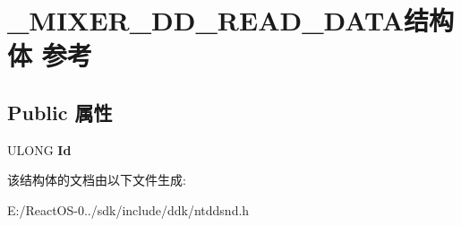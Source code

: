 \hypertarget{struct___m_i_x_e_r___d_d___r_e_a_d___d_a_t_a}{}\section{\+\_\+\+M\+I\+X\+E\+R\+\_\+\+D\+D\+\_\+\+R\+E\+A\+D\+\_\+\+D\+A\+T\+A结构体 参考}
\label{struct___m_i_x_e_r___d_d___r_e_a_d___d_a_t_a}
\subsection*{Public 属性}
\begin{DoxyCompactItemize}
\item 
\mbox{\label{struct___m_i_x_e_r___d_d___r_e_a_d___d_a_t_a_ae6c3271bcf59fc809e163509395a9a0f}} 
U\+L\+O\+NG {\bfseries Id}
\end{DoxyCompactItemize}


该结构体的文档由以下文件生成\+:\begin{DoxyCompactItemize}
\item 
E\+:/\+React\+O\+S-\/0../sdk/include/ddk/ntddsnd.\+h\end{DoxyCompactItemize}
